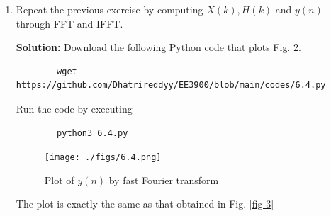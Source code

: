 \documentclass[journal,12pt,twocolumn]{IEEEtran}
\newcommand{\solution}{\noindent \textbf{Solution: }}
\numberwithin{equation}{section}
\renewcommand\thesection{\arabic{section}}
\begin{document}
\begin{enumerate}[label=\thesection.\arabic*]
	\solution Download the following Python code that plots Fig. \ref{fig-6.3}.
	\begin{lstlisting}
		wget https://github.com/Dhatrireddyy/EE3900/blob/main/codes/6.3.py
	\end{lstlisting}
	
	Run the code by executing
	\begin{lstlisting}
		python3 6.3.py
	\end{lstlisting}

	\begin{figure}[!ht]
		\centering
		\texttt{[image: figs/6.3.png]}
		\caption{Plot of the inverse discrete Fourier transform of $Y(k)$}
		\label{fig-6.3}	
	\end{figure}
	
	The plot is exactly the same as that obtained in Fig. \ref{fig-3}. Therefore, we conclude that 
	\begin{align}
		y(n) &= x(n) * h(n) \\
		\iff Y(k) &= X(k)H(k)
	\end{align}
	
	\item Repeat the previous exercise by computing $X(k), H(k)$ and $y(n)$ through FFT and 
IFFT.
	
	\solution Download the following Python code that plots Fig. \ref{fig-6.4}.
	\begin{lstlisting}
		wget https://github.com/Dhatrireddyy/EE3900/blob/main/codes/6.4.py
	\end{lstlisting}
	
	Run the code by executing
	\begin{lstlisting}
		python3 6.4.py
	\end{lstlisting}

	\begin{figure}[!ht]
		\centering
		\texttt{[image: ./figs/6.4.png]}
		\caption{Plot of $y(n)$ by fast Fourier transform}
		\label{fig-6.4}	
	\end{figure}
	
	The plot is exactly the same as that obtained in Fig. \ref{fig-3}
	
	\end{enumerate}
	
\end{document}
